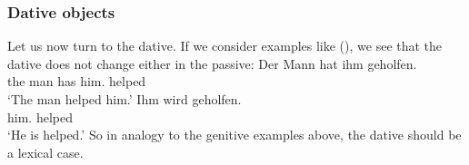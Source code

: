 \subsubsection{Dative objects}
\label{sec-dative-objects-tructurl-lexical}

Let us now turn to the dative. If we consider examples like (), we see that the dative does not
change either in the passive:
\eal
\ex 
\gll Der Mann hat ihm geholfen.\\
     the\NOM{} man  has him.\DAT{} helped\\
\glt `The man helped him.'
\ex 
\gll Ihm        wird geholfen.\\
     him.\DAT{} \AUX{} helped\\
\glt `He is helped.'
\zl
So in analogy to the genitive examples above, the dative should be a lexical case.

